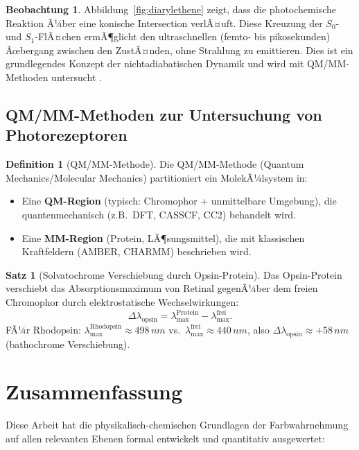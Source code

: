 ﻿\documentclass[a4paper,12pt]{article}
\theoremstyle{definition}
\newtheorem{definition}{Definition}
\newtheorem{satz}{Satz}
\newtheorem{beobachtung}{Beobachtung}
\begin{document}
\begin{beobachtung}
Abbildung~\ref{fig:diarylethene} zeigt, dass die photochemische Reaktion Ã¼ber eine
konische Intersection verlÃ¤uft. Diese Kreuzung der $S_0$- und $S_1$-FlÃ¤chen
ermÃ¶glicht den ultraschnellen (femto- bis pikosekunden) Ãœbergang zwischen den ZustÃ¤nden,
ohne Strahlung zu emittieren. Dies ist ein grundlegendes Konzept der
nichtadiabatischen Dynamik und wird mit QM/MM-Methoden untersucht
\cite{gozem2012}.
\end{beobachtung}

\subsection{QM/MM-Methoden zur Untersuchung von Photorezeptoren}

\begin{definition}[QM/MM-Methode]
Die QM/MM-Methode (Quantum Mechanics/Molecular Mechanics) partitioniert ein MolekÃ¼lsystem in:
\begin{itemize}
  \item Eine \textbf{QM-Region} (typisch: Chromophor + unmittelbare Umgebung),
        die quantenmechanisch (z.B.\ DFT, CASSCF, CC2) behandelt wird.
  \item Eine \textbf{MM-Region} (Protein, LÃ¶sungsmittel),
        die mit klassischen Kraftfeldern (AMBER, CHARMM) beschrieben wird.
\end{itemize}
\end{definition}

\begin{satz}[Solvatochrome Verschiebung durch Opsin-Protein]
Das Opsin-Protein verschiebt das Absorptionsmaximum von Retinal gegenÃ¼ber dem freien
Chromophor durch elektrostatische Wechselwirkungen:
\[
  \Delta\lambda_{\mathrm{opsin}} = \lambda_{\max}^{\mathrm{Protein}} - \lambda_{\max}^{\mathrm{frei}}.
\]
FÃ¼r Rhodopsin: $\lambda_{\max}^{\mathrm{Rhodopsin}} \approx 498\,\si{nm}$ vs.\
$\lambda_{\max}^{\mathrm{frei}} \approx 440\,\si{nm}$,
also $\Delta\lambda_{\mathrm{opsin}} \approx +58\,\si{nm}$ (bathochrome Verschiebung).
\end{satz}

\section{Zusammenfassung}

Diese Arbeit hat die physikalisch-chemischen Grundlagen der Farbwahrnehmung
auf allen relevanten Ebenen formal entwickelt und quantitativ ausgewertet:
\end{document}

